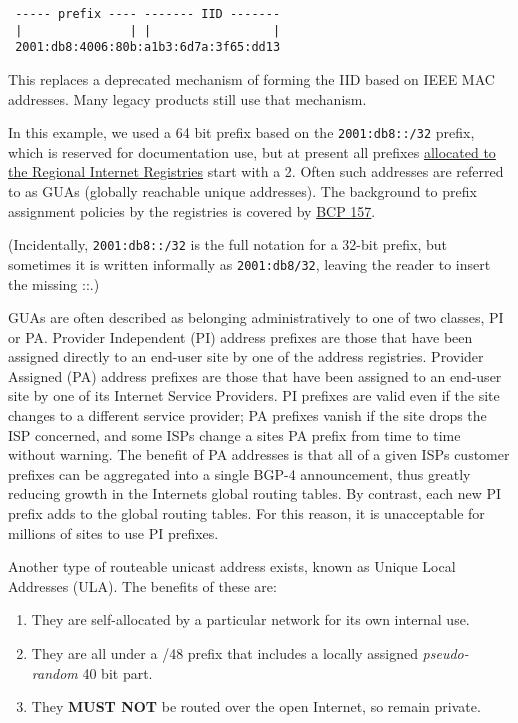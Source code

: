\documentclass[
]{article}
\providecommand{\tightlist}{%
  \setlength{\itemsep}{0pt}\setlength{\parskip}{0pt}}
\begin{document}
\begin{verbatim}
 ----- prefix ---- ------- IID -------
 |               | |                 |
 2001:db8:4006:80b:a1b3:6d7a:3f65:dd13
\end{verbatim}

This replaces a deprecated mechanism of forming the IID based on IEEE
MAC addresses. Many legacy products still use that mechanism.

In this example, we used a 64 bit prefix based on the
\texttt{2001:db8::/32} prefix, which is reserved for documentation use,
but at present all prefixes
\href{https://www.iana.org/assignments/ipv6-unicast-address-assignments/ipv6-unicast-address-assignments.xhtml}{allocated
to the Regional Internet Registries} start with a 2. Often such
addresses are referred to as GUAs (globally reachable unique addresses).
The background to prefix assignment policies by the registries is
covered by \href{https://www.rfc-editor.org/info/bcp157}{BCP 157}.

(Incidentally, \texttt{2001:db8::/32} is the full notation for a 32-bit
prefix, but sometimes it is written informally as \texttt{2001:db8/32},
leaving the reader to insert the missing
\textquotesingle::\textquotesingle.)

GUAs are often described as belonging administratively to one of two
classes, PI or PA. Provider Independent (PI) address prefixes are those
that have been assigned directly to an end-user site by one of the
address registries. Provider Assigned (PA) address prefixes are those
that have been assigned to an end-user site by one of its Internet
Service Providers. PI prefixes are valid even if the site changes to a
different service provider; PA prefixes vanish if the site drops the ISP
concerned, and some ISPs change a site\textquotesingle s PA prefix from
time to time without warning. The benefit of PA addresses is that all of
a given ISP\textquotesingle s customer prefixes can be aggregated into a
single BGP-4 announcement, thus greatly reducing growth in the
Internet\textquotesingle s global routing tables. By contrast, each new
PI prefix adds to the global routing tables. For this reason, it is
unacceptable for millions of sites to use PI prefixes.

Another type of routeable unicast address exists, known as Unique Local
Addresses (ULA). The benefits of these are:

\begin{enumerate}
\def\labelenumi{\arabic{enumi}.}
\tightlist
\item
  They are self-allocated by a particular network for its own internal
  use.
\item
  They are all under a /48 prefix that includes a locally assigned
  \emph{pseudo-random} 40 bit part.
\item
  They \textbf{MUST NOT} be routed over the open Internet, so remain
  private.
\end{enumerate}
\end{document}
